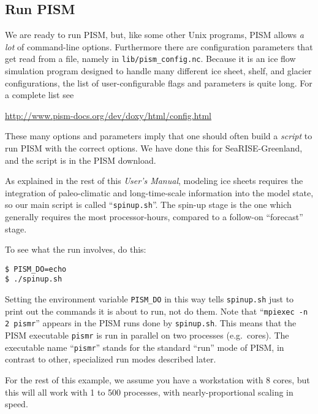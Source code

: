\subsection{Run PISM}   \label{subsect:runscript}  We are ready to run PISM, but, like some other Unix programs, PISM allows \emph{a lot} of command-line options.  Furthermore there are configuration parameters that get read from a file, namely in \texttt{lib/pism_config.nc}.  Because it is an ice flow simulation program designed to handle many different ice sheet, shelf, and glacier configurations, the list of user-configurable flags and parameters is quite long.  For a complete list see
\begin{center}
\url{http://www.pism-docs.org/dev/doxy/html/config.html}
\end{center}

These many options and parameters imply that one should often build a \emph{script} to run PISM with the correct options.  We have done this for SeaRISE-Greenland, and the script is in the PISM download.

As explained in the rest of this \emph{User's Manual}, modeling ice sheets requires the integration of paleo-climatic and long-time-scale information into the model state, so our main script is called ``\texttt{spinup.sh}''.  The spin-up stage is the one which generally requires the most processor-hours, compared to a follow-on ``forecast'' stage.

To see what the run involves, do this:
\begin{verbatim}
$ PISM_DO=echo
$ ./spinup.sh
\end{verbatim}
\noindent Setting the environment variable \texttt{PISM_DO} in this way tells \texttt{spinup.sh} just to print out the commands it is about to run, not do them.  Note that ``\texttt{mpiexec -n 2 pismr}'' appears in the PISM runs done by \texttt{spinup.sh}.  This means that the PISM executable \texttt{pismr} is run in parallel on two processes (e.g.~cores).  The executable name ``\texttt{pismr}'' stands for the standard ``run'' mode of PISM, in contrast to other, specialized run modes described later.

For the rest of this example, we assume you have a workstation with 8 cores, but this will all work with 1 to 500 processes, with nearly-proportional scaling in speed.


